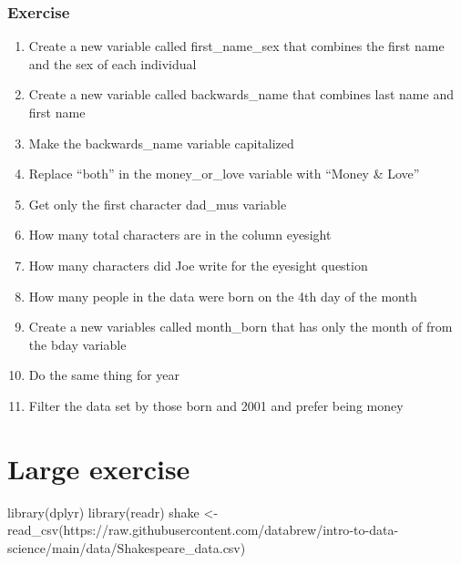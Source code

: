 \documentclass[
]{book}
\newenvironment{Shaded}{\begin{snugshade}}{\end{snugshade}}
\newcommand{\FunctionTok}[1]{\textcolor[rgb]{0.00,0.00,0.00}{#1}}
\newcommand{\NormalTok}[1]{#1}
\newcommand{\OtherTok}[1]{\textcolor[rgb]{0.56,0.35,0.01}{#1}}
\newcommand{\StringTok}[1]{\textcolor[rgb]{0.31,0.60,0.02}{#1}}
\begin{document}
\hypertarget{exercise}{%
\subsubsection*{Exercise}\label{exercise}}

\begin{enumerate}
\def\labelenumi{\arabic{enumi})}
\item
  Create a new variable called first\_name\_sex that combines the first name and the sex of each individual
\item
  Create a new variable called backwards\_name that combines last name and first name
\item
  Make the backwards\_name variable capitalized
\item
  Replace ``both'' in the money\_or\_love variable with ``Money \& Love''
\item
  Get only the first character dad\_mus variable
\item
  How many total characters are in the column eyesight
\item
  How many characters did Joe write for the eyesight question
\item
  How many people in the data were born on the 4th day of the month
\item
  Create a new variables called month\_born that has only the month of from the bday variable
\item
  Do the same thing for year
\item
  Filter the data set by those born and 2001 and prefer being money
\end{enumerate}

\hypertarget{large-exercise}{%
\section{Large exercise}\label{large-exercise}}

\begin{Shaded}
\begin{Highlighting}[]

\FunctionTok{library}\NormalTok{(dplyr)}
\FunctionTok{library}\NormalTok{(readr)}
\NormalTok{shake }\OtherTok{\textless{}{-}} \FunctionTok{read\_csv}\NormalTok{(}\StringTok{\textquotesingle{}https://raw.githubusercontent.com/databrew/intro{-}to{-}data{-}science/main/data/Shakespeare\_data.csv\textquotesingle{}}\NormalTok{)}
\end{Highlighting}
\end{Shaded}
\end{document}

